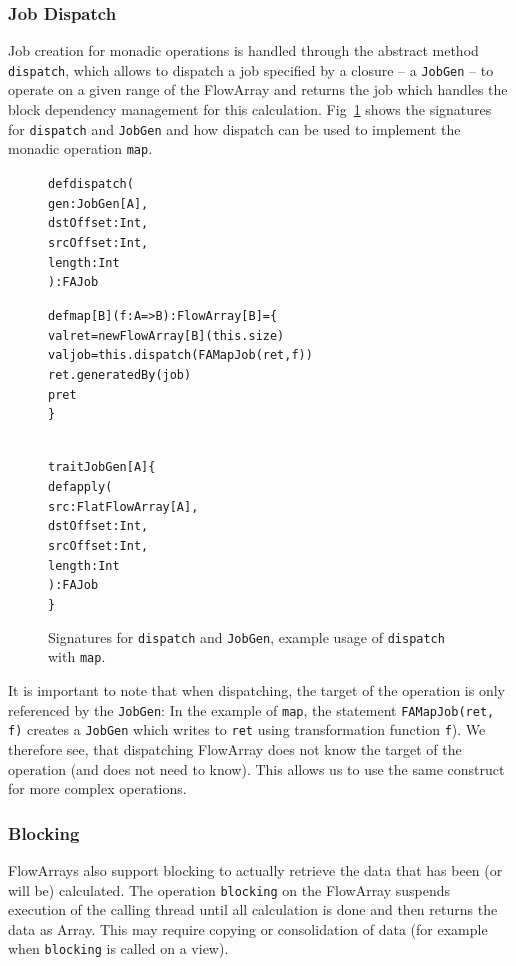 \documentclass[runningheads,a4paper,fleqn]{llncs}
\begin{document}
\subsubsection{Job Dispatch}
Job creation for monadic operations is handled through the abstract
method \texttt{dispatch}, which allows to dispatch a job specified by
a closure -- a \texttt{JobGen} -- to operate on a given range of the
FlowArray and returns the job which handles the block dependency
management for this calculation. Fig~\ref{fig:dispatch-code} shows the
signatures for \texttt{dispatch} and \texttt{JobGen} and how dispatch
can be used to implement the monadic operation \texttt{map}.

\begin{figure}
\begin{minipage}[t]{6cm}
\begin{alltt}
{\scriptsize
def dispatch(
  gen: JobGen[A],
  dstOffset: Int,
  srcOffset: Int,
  length: Int
): FAJob

def map[B](f: A => B): FlowArray[B] = \{
    val ret = newFlowArray[B](this.size)
    val job = this.dispatch(FAMapJob(ret, f))
    ret.generatedBy(job)
  p  ret
\}
}
\end{alltt}
\end{minipage}
\begin{minipage}[t]{7cm}
\begin{alltt}
{\scriptsize
trait JobGen[A] \{
  def apply(
    src: FlatFlowArray[A],
    dstOffset: Int,
    srcOffset: Int,
    length: Int
  ): FAJob
\}
}
\end{alltt}
\end{minipage}
\caption{Signatures for \texttt{dispatch} and \texttt{JobGen}, example
  usage of \texttt{dispatch} with \texttt{map}.}
\label{fig:dispatch-code}
\end{figure}

It is important to note that when dispatching, the target of the
operation is only referenced by the \texttt{JobGen}: In the example of
\texttt{map}, the statement \texttt{FAMapJob(ret, f)} creates a
\texttt{JobGen} which writes to \texttt{ret} using transformation
function \texttt{f}). We therefore see, that dispatching FlowArray
does not know the target of the operation (and does not need to
know). This allows us to use the same construct for more complex
operations.

\subsubsection{Blocking}
FlowArrays also support blocking to actually retrieve the data that
has been (or will be) calculated. The operation \texttt{blocking} on
the FlowArray suspends execution of the calling thread until all
calculation is done and then returns the data as Array. This may
require copying or consolidation of data (for example when
\texttt{blocking} is called on a view).
\end{document}
